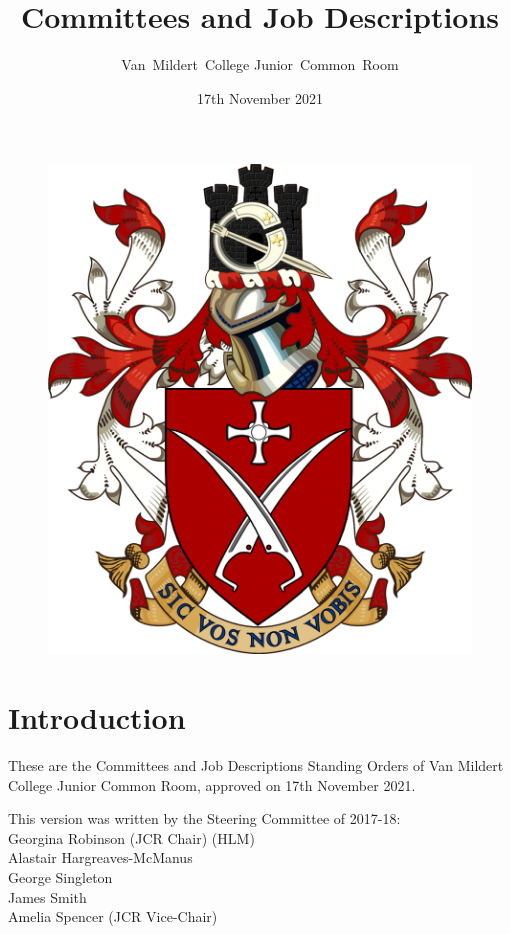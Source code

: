 \documentclass[12pt]{article}
\title{Committees and Job Descriptions}
\author{Van~Mildert~College Junior~Common~Room}
\date{17th November 2021}
\begin{document}
\begin{titlepage}  %
    \maketitle
    \begin{figure}[h]
    \includegraphics[scale=0.25]{arms}  %
    \centering
    \end{figure}
    \thispagestyle{empty}
\end{titlepage}

\setcounter{page}{2}  %
\section*{Introduction}
These are the Committees and Job Descriptions Standing Orders of Van Mildert College Junior Common Room, approved on 17th November 2021.

This version was written by the Steering Committee of 2017-18:\\
\hspace*{2cm}Georgina Robinson (JCR Chair) (HLM)\\
\hspace*{2cm}Alastair Hargreaves-McManus\\
\hspace*{2cm}George Singleton\\
\hspace*{2cm}James Smith\\
\hspace*{2cm}Amelia Spencer (JCR Vice-Chair)
\end{document}
